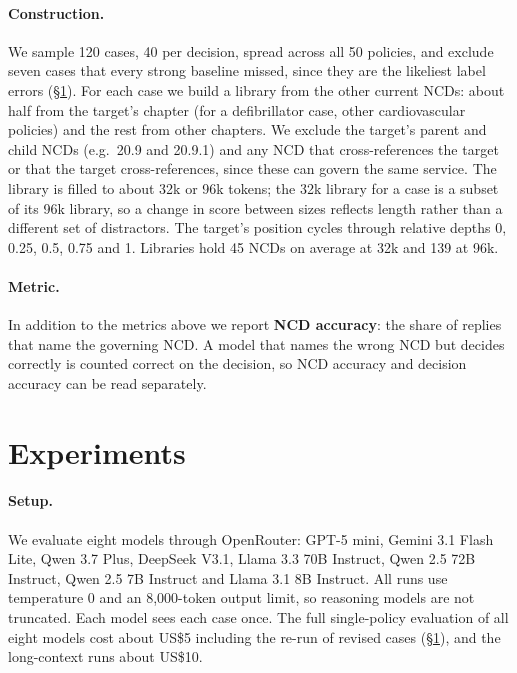 \documentclass[11pt]{article}
\begin{document}
\paragraph{Construction.} We sample 120 cases, 40 per decision, spread across all 50 policies, and
exclude seven cases that every strong baseline missed, since they are the likeliest label errors
(\S\ref{sec:results}). For each case we build a library from the other current NCDs: about half from
the target's chapter (for a defibrillator case, other cardiovascular policies) and the rest from
other chapters. We exclude the target's parent and child NCDs (e.g.\ 20.9 and 20.9.1) and any
NCD that cross-references the target or that the target cross-references, since these can govern
the same service. The library is filled to about 32k or 96k tokens; the 32k library for a case
is a subset of its 96k library, so a change in score between sizes reflects length rather than a
different set of distractors. The target's position cycles through relative depths 0, 0.25, 0.5,
0.75 and 1. Libraries hold 45 NCDs on average at 32k and 139 at 96k.

\paragraph{Metric.} In addition to the metrics above we report \textbf{NCD accuracy}: the share of
replies that name the governing NCD. A model that names the wrong NCD but decides correctly is
counted correct on the decision, so NCD accuracy and decision accuracy can be read separately.

\section{Experiments}
\label{sec:results}

\paragraph{Setup.} We evaluate eight models through OpenRouter: GPT-5 mini, Gemini 3.1 Flash Lite,
Qwen 3.7 Plus, DeepSeek V3.1, Llama 3.3 70B Instruct, Qwen 2.5 72B Instruct, Qwen 2.5 7B Instruct
and Llama 3.1 8B Instruct. All runs use temperature 0 and an 8,000-token output limit, so reasoning
models are not truncated. Each model sees each case once. The full single-policy evaluation of all
eight models cost about US\$5 including the re-run of revised cases (\S\ref{sec:results}), and
the long-context runs about US\$10.
\end{document}
